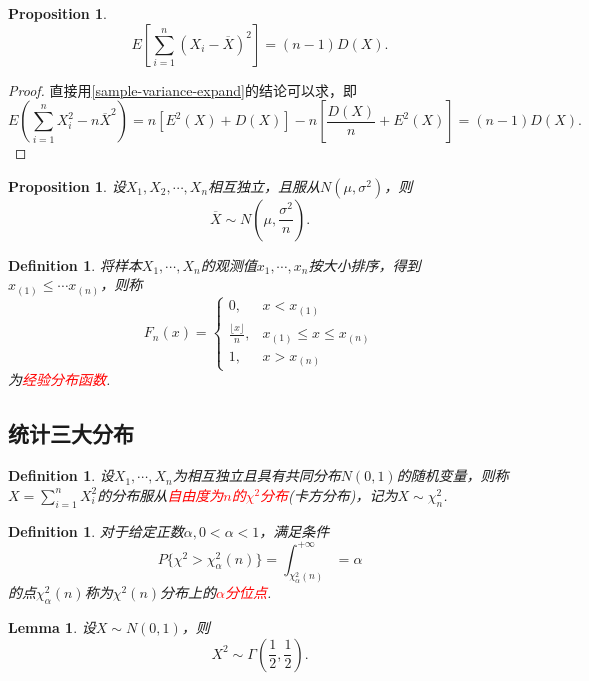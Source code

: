 \documentclass{article}
\newtheorem{lemma}[theorem]{Lemma}
\newtheorem{proposition}[theorem]{Proposition}
\newtheorem{definition}[theorem]{Definition}
\newcommand{\redt}[1]{\textcolor{red}{#1}}
\begin{document}
\begin{proposition}
\rm 
$$
E\left[ \sum\limits_{i = 1}^n  (X_i - \overline{X})^2 \right] = (n-1)D(X).
$$
\end{proposition}

\begin{proof}
\rm 直接用\ref{sample-variance-expand}的结论可以求，即
$$
E(\sum\limits_{i = 1}^n X_i^2  - n\overline{X}^2) = n\left[E^2(X) + D(X)\right]- n\left[\frac{D(X)}{n} + E^2(X)\right] = (n-1)D(X). 
$$
\end{proof}

\begin{proposition}\label{sample-mean-distribution}
\rm 设$X_1,X_2,\cdots,X_n$相互独立，且服从$N(\mu,\sigma^2)$，则
$$
\overline{X} \sim N(\mu,\frac{\sigma^2}{n}).
$$
\end{proposition}

\begin{definition}
\rm 将样本$X_1,\cdots,X_n$的观测值$x_1,\cdots,x_n$按大小排序，得到$x_{(1)} \leq \cdots x_{(n)}$，则称
$$
F_n(x) = \left\{
\begin{array}{ll}
0, & x <x_{(1)} \\
\frac{\lfloor x \rfloor}{n}, &  x_{(1)}\leq x \leq x_{(n)}\\
1, &x > x_{(n)}
\end{array} \right.
$$
为\redt{经验分布函数}.
\end{definition}

\subsection{统计三大分布}

\begin{definition}
\rm 设$X_1,\cdots,X_n$为相互独立且具有共同分布$N(0,1)$的随机变量，则称$X=\sum\limits_{i=1}^n X_i^2$的分布服从\redt{自由度为$n$的$\chi ^2$分布}(卡方分布)，记为$X \sim \chi_n^2$.
\end{definition}

\begin{definition}
\rm 对于给定正数$\alpha, 0 <\alpha <1$，满足条件
$$
P\{\chi^2 > \chi_\alpha^2(n)\} = \int_{\chi_\alpha^2(n)}^{+\infty} = \alpha
$$
的点$\chi_\alpha^2(n)$称为$\chi^2(n)$分布上的\redt{$\alpha$分位点}. 
\end{definition}

\begin{lemma}\label{for-chi-proof}
\rm 设$X \sim N(0,1)$，则
$$
X^2 \sim \Gamma(\frac{1}{2},\frac{1}{2}). 
$$
\end{lemma}
\end{document}

